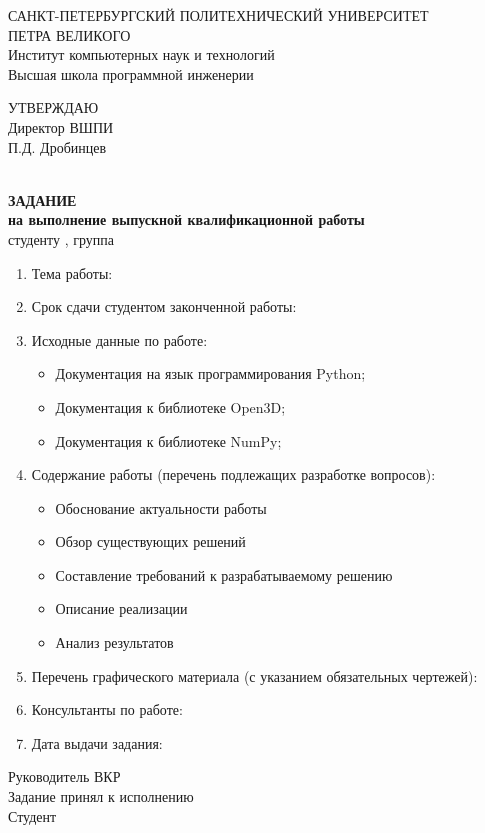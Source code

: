 \begin{center}
  {САНКТ-ПЕТЕРБУРГСКИЙ ПОЛИТЕХНИЧЕСКИЙ УНИВЕРСИТЕТ\\ ПЕТРА ВЕЛИКОГО} \\
  {Институт компьютерных наук и технологий} \\
  {Высшая школа программной инженерии} \\

  {
  \begin{flushright}
    УТВЕРЖДАЮ\\
    Директор ВШПИ\\
    \underline{\hspace{2.2cm}} П.Д. Дробинцев\\
    \TaskCreatedBukvami\\[1.8cm]
  \end{flushright}
  }

  \textbf{ЗАДАНИЕ} \\
  \textbf{на выполнение выпускной квалификационной работы}\\
  студенту \AuthorFull, группа \Group \\[0.5cm]
  \begin{enumerate}[label=\arabic*.]
    \item Тема работы: \Theme
    \item Срок сдачи студентом законченной работы: \TaskDeadline
    \item Исходные данные по работе:
      \begin{itemize}
        \item Документация на язык программирования Python;
        \item Документация к библиотеке Open3D;
        \item Документация к библиотеке NumPy;
      \end{itemize}
    \item Содержание работы (перечень подлежащих разработке вопросов):
      \begin{itemize}
        \item Обоснование актуальности работы
        \item Обзор существующих решений
        \item Составление требований к разрабатываемому решению
        \item Описание реализации
        \item Анализ результатов
      \end{itemize}
    \item Перечень графического материала (с указанием обязательных чертежей):
    \item Консультанты по работе:
    \item Дата выдачи задания: \TaskCreatedCiframi
  \end{enumerate}
\end{center}
Руководитель ВКР \hspace{3.5cm} \underline{\hspace{5cm}} \hfill \Supervisor\\[0.5cm]
Задание принял к исполнению \TaskCreatedCiframi\\[0.5cm]
Студент \hspace{5.8cm} \underline{\hspace{5cm}} \hfill \Author\\
